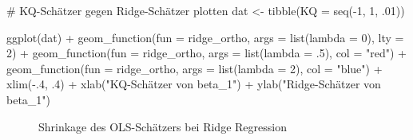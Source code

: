 \documentclass[
  a4paper,
  DIV=11,
  oneside]{scrreprt}
\newenvironment{Shaded}{\begin{snugshade}}{\end{snugshade}}
\newcommand{\AttributeTok}[1]{\textcolor[rgb]{0.40,0.45,0.13}{#1}}
\newcommand{\CommentTok}[1]{\textcolor[rgb]{0.37,0.37,0.37}{#1}}
\newcommand{\DecValTok}[1]{\textcolor[rgb]{0.68,0.00,0.00}{#1}}
\newcommand{\FunctionTok}[1]{\textcolor[rgb]{0.28,0.35,0.67}{#1}}
\newcommand{\NormalTok}[1]{\textcolor[rgb]{0.00,0.23,0.31}{#1}}
\newcommand{\OtherTok}[1]{\textcolor[rgb]{0.00,0.23,0.31}{#1}}
\newcommand{\SpecialCharTok}[1]{\textcolor[rgb]{0.37,0.37,0.37}{#1}}
\newcommand{\StringTok}[1]{\textcolor[rgb]{0.13,0.47,0.30}{#1}}
\begin{document}
\begin{Shaded}
\begin{Highlighting}[]
\CommentTok{\# KQ{-}Schätzer gegen Ridge{-}Schätzer plotten}
\NormalTok{dat }\OtherTok{\textless{}{-}} \FunctionTok{tibble}\NormalTok{(}\AttributeTok{KQ =} \FunctionTok{seq}\NormalTok{(}\SpecialCharTok{{-}}\DecValTok{1}\NormalTok{, }\DecValTok{1}\NormalTok{, .}\DecValTok{01}\NormalTok{))}

\FunctionTok{ggplot}\NormalTok{(dat) }\SpecialCharTok{+}
  \FunctionTok{geom\_function}\NormalTok{(}\AttributeTok{fun =}\NormalTok{ ridge\_ortho, }
                \AttributeTok{args =} \FunctionTok{list}\NormalTok{(}\AttributeTok{lambda =}  \DecValTok{0}\NormalTok{), }
                \AttributeTok{lty =} \DecValTok{2}\NormalTok{) }\SpecialCharTok{+} 
  \FunctionTok{geom\_function}\NormalTok{(}\AttributeTok{fun =}\NormalTok{ ridge\_ortho, }
                \AttributeTok{args =} \FunctionTok{list}\NormalTok{(}\AttributeTok{lambda =}\NormalTok{ .}\DecValTok{5}\NormalTok{), }
                \AttributeTok{col =} \StringTok{"red"}\NormalTok{) }\SpecialCharTok{+} 
  \FunctionTok{geom\_function}\NormalTok{(}\AttributeTok{fun =}\NormalTok{ ridge\_ortho, }
                \AttributeTok{args =} \FunctionTok{list}\NormalTok{(}\AttributeTok{lambda =} \DecValTok{2}\NormalTok{), }
                \AttributeTok{col =} \StringTok{"blue"}\NormalTok{) }\SpecialCharTok{+} 
  \FunctionTok{xlim}\NormalTok{(}\SpecialCharTok{{-}}\NormalTok{.}\DecValTok{4}\NormalTok{, .}\DecValTok{4}\NormalTok{) }\SpecialCharTok{+}
  \FunctionTok{xlab}\NormalTok{(}\StringTok{"KQ{-}Schätzer von beta\_1"}\NormalTok{) }\SpecialCharTok{+}
  \FunctionTok{ylab}\NormalTok{(}\StringTok{"Ridge{-}Schätzer von beta\_1"}\NormalTok{)}
\end{Highlighting}
\end{Shaded}

\begin{figure}[t]


\caption{\label{fig-ridgeortho}Shrinkage des OLS-Schätzers bei Ridge
Regression}

\end{figure}%
\end{document}
